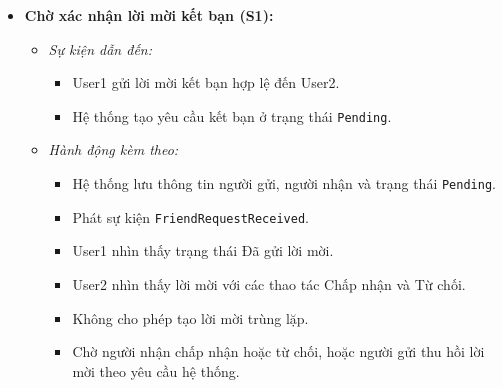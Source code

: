 \documentclass[11pt,a4paper]{article}
\begin{document}
\begin{itemize}[leftmargin=1.2cm, noitemsep]
    \item[\textbf{--}] \textbf{Chờ xác nhận lời mời kết bạn (S1):}
    \begin{itemize}[leftmargin=0.8cm, label=--, noitemsep]
        \item \textit{Sự kiện dẫn đến:}
        \begin{itemize}[leftmargin=0.6cm, label=$\ast$, noitemsep]
            \item User1 gửi lời mời kết bạn hợp lệ đến User2.
            \item Hệ thống tạo yêu cầu kết bạn ở trạng thái \texttt{Pending}.
        \end{itemize}
        \item \textit{Hành động kèm theo:}
        \begin{itemize}[leftmargin=0.6cm, label=$\ast$, noitemsep]
            \item Hệ thống lưu thông tin người gửi, người nhận và trạng thái \texttt{Pending}.
            \item Phát sự kiện \texttt{FriendRequestReceived}.
            \item User1 nhìn thấy trạng thái Đã gửi lời mời.
            \item User2 nhìn thấy lời mời với các thao tác Chấp nhận và Từ chối.
            \item Không cho phép tạo lời mời trùng lặp.
            \item Chờ người nhận chấp nhận hoặc từ chối, hoặc người gửi thu hồi lời mời theo yêu cầu hệ thống.
        \end{itemize}
    \end{itemize}


\end{itemize}
\end{document}

